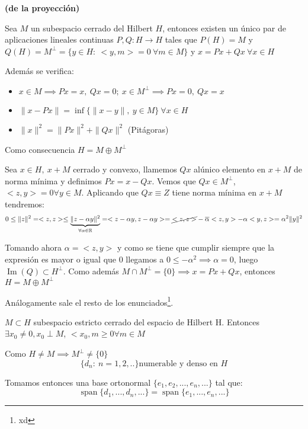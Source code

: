\documentclass[openany]{book}
\begin{document}
\begin{theorem}
    \textbf{(de la proyección)}    

    Sea $ M  $ un subespacio cerrado del Hilbert $ H $, entonces existen un único par de aplicaciones lineales continuas $ P,Q: H \to H $ tales que $ P(H) = M $ y $ Q(H) = M^{\perp } = \{y \in H:\ <y,m> = 0\ \forall  m \in M\} $ y $ x = Px+Qx\ \forall x \in H $

    Además se verifica:
    \begin{itemize}
        \item $ x \in M \implies Px =x,\ Qx = 0;\ x \in M ^{\perp} \implies Px = 0,\ Qx = x $
        \item $ \|x-Px\| = \inf \{\|x-y\|,\ y \in M\}\ \forall x \in H $
        \item $ \|x\|^2 = \|Px\|^2+\|Qx\|^2 $ (Pitágoras)
    \end{itemize}

    Como consecuencia $ H = M \oplus M^{\perp} $
\end{theorem}

\begin{demonstration}

    Sea $ x \in H,\ x+M $ cerrado y convexo, llamemos $ Qx $ alúnico elemento en $ x+M $ de norma mínima y definimos $ Px = x-Qx $. Vemos que $ Qx \in M^{\perp} $, $ <z,y> = 0 \forall y \in M $. Aplicando que $ Qx \equiv Z $ tiene norma mínima en $ x+M $ tendremos:
    $$ 0\leq  \|z\|^2 = <z,z> \leq  \underbrace{\|z-\alpha y\|^2}_{ \forall \alpha \in \mathbb{R}} = <z-\alpha y,z-\alpha y> = \cancel{<z,z>} - \overline{\alpha}<z,y> - \alpha <y,z> = \alpha ^2\|y\|^2  $$
    
    Tomando ahora $ \alpha = <z,y>  $ y como se tiene que cumplir siempre que la expresión es mayor o igual que 0 llegamos a $ 0 \leq  -\alpha ^2 \implies \alpha = 0 $, luego $ \operatorname{Im}(Q) \subset H^{\perp} $. Como además $ M \cap M^{\perp} = \{0\} \implies x = Px+Qx $, entonces $ H = M \oplus M^{\perp} $

    Análogamente sale el resto de los enunciados\footnote{xd}.

\end{demonstration}

\begin{lemma}
    $ M \subset H $ subespacio estricto cerrado del espacio de Hilbert H. Entonces $ \exists x_0 \ne 0, x_0 \perp M $, $ <x_0,m\geq 0 \forall m \in M $

\end{lemma}
\begin{demonstration}

    Como $ H \ne M \implies M ^{\perp} \ne \{0\} $
    $$ \{d_n:\ n=1,2,..\} \text{numerable y denso en }H$$
    
    Tomamos entonces una base ortonormal $ \{e_1,e_2,...,e_n,...\} $ tal que:
    $$ \operatorname{span} \{d_1,...,d_n,...\} = \operatorname{span} \{e_1,...,e_n,...\} $$
\end{demonstration}
    
\end{document}
